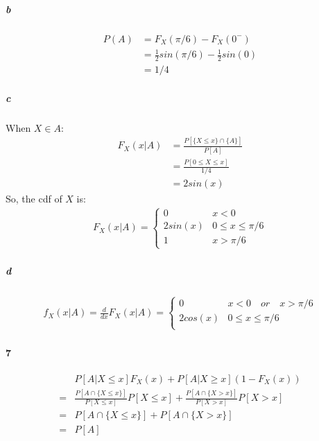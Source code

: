 \documentclass[22pt]{article}
\begin{document}
			\subparagraph{b}
			\begin{align}
			P(A) & = F_X(\pi/6) - F_X(0^-) \\
			& = \frac{1}{2}sin(\pi/6) -\frac{1}{2}sin(0)\\
			& = 1/4
			\end{align}
			\subparagraph{c} When $X \in A$: 
			\begin{align}
			F_X(x|A) & = \frac{P[\{X\leq x\}\cap\{A\}]}{P[A]}\\
			& = \frac{P[{0\leq X \leq x}]}{1/4}\\
			& = 2sin(x)
			\end{align}
			So, the cdf of $X$ is:
			\begin{align}
				F_X(x|A) = 
				\begin{cases}
				0 & x<0\\
				2sin(x) & 0 \leq x \leq \pi	/6\\
				1 & x>\pi/6
				\end{cases}
			\end{align}

		\subparagraph{d} 
					\begin{align}
					f_X(x|A) = \frac{d}{dx} F_X(x|A)=
					\begin{cases}
					0 & x<0 \quad or \quad x>\pi	/6\\
					2cos(x) & 0 \leq x \leq \pi	/6\\
					\end{cases}
				\end{align}

		\paragraph{7}
		\begin{align}
		& P[A|X\leq x]F_X(x) + P[A|X\geq x](1-F_X(x)) \\
		= & \frac{P[A\cap\{X\leq x\}]}{P[X\leq x]}P[X\leq x] + \frac{P[A\cap\{X> x\}]}{P[X> x]}P[X>x]\\
		= & P[A\cap\{X\leq x\}] + P[A\cap\{X> x\}]\\
		= & P[A]
		\end{align}
\end{document}
